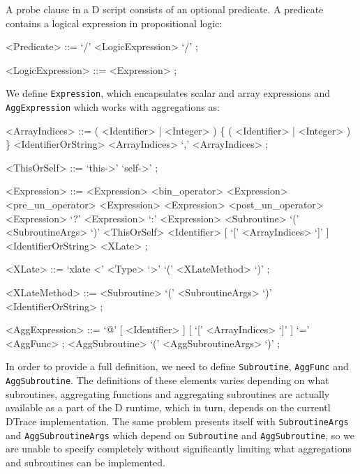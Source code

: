 \noindent
A probe clause in a D script consists of an optional predicate. A
predicate contains a logical expression in propositional logic:

\begin{grammar}
<Predicate> ::= `/' <LogicExpression> `/' ;

<LogicExpression> ::= <Expression> ;
\end{grammar}

\noindent
We define \texttt{Expression}, which encapsulates scalar and array
expressions and \texttt{AggExpression} which works with aggregations
as:
\begin{grammar}
<ArrayIndices> ::= ( <Identifier> | <Integer> ) \{ ( <Identifier> | <Integer> ) \}
               \alt <IdentifierOrString>
               \alt <ArrayIndices> `,' <ArrayIndices> ;

<ThisOrSelf> ::= `this->'
             \alt `self->' ;

<Expression> ::=  <Expression> <bin\_operator> <Expression>
             \alt <pre\_un\_operator> <Expression>
             \alt <Expression> <post\_un\_operator>
             \alt <Expression> `?' <Expression> `:' <Expression>
             \alt <Subroutine> `(' <SubroutineArgs> `)'
             \alt <ThisOrSelf> <Identifier> [ `[' <ArrayIndices> `]' ]
             \alt <IdentifierOrString>
             \alt <XLate> ;

<XLate> ::= `xlate <' <Type> `>' `(' <XLateMethod> `)' ;

<XLateMethod> ::=  <Subroutine> `(' <SubroutineArgs> `)'
              \alt <IdentifierOrString> ;


<AggExpression> ::=  `@' [ <Identifier> ] [ `[' <ArrayIndices> `]' ] `=' <AggFunc> ;
                \alt <AggSubroutine> `(' <AggSubroutineArgs> `)' ;
\end{grammar}

\noindent
In order to provide a full definition, we need to define
\texttt{Subroutine}, \texttt{AggFunc} and \texttt{AggSubroutine}. The
definitions of these elements varies depending on what subroutines,
aggregating functions and aggregating subroutines are actually
available as a part of the D runtime, which in turn, depends on the
currentl DTrace implementation. The same problem presents itself with
\texttt{SubroutineArgs} and \texttt{AggSubroutineArgs} which depend on
\texttt{Subroutine} and \texttt{AggSubroutine}, so we are unable to
specify completely without significantly limiting what aggregations
and subroutines can be implemented. \newline

